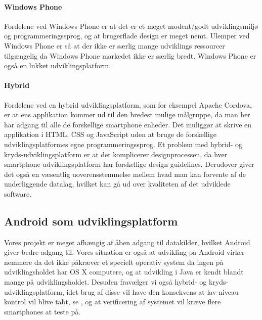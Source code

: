 \paragraph{Windows Phone}
Fordelene ved Windows Phone er at det er et meget modent/godt udviklingsmiljø og programmeringssprog, og at brugerflade design er meget nemt. 
Ulemper ved Windows Phone er så at der ikke er særlig mange udviklings ressourcer tilgængelig da Windows Phone markedet ikke er særlig bredt.
Windows Phone er også en lukket udviklingsplatform.

\paragraph{Hybrid}
Fordelene ved en hybrid udviklingsplatform, som for eksempel Apache Cordova, er at ens applikation kommer ud til den bredest mulige målgruppe, da man her har adgang til alle de forskellige smartphone enheder.
Det muliggør at skrive en applikation i HTML, CSS og JavaScript uden at bruge de forskellige udviklingsplatformes egne programmeringssprog.
Et problem med hybrid- og kryds-udviklingsplatform er at det komplicerer designprocessen, da hver smartphone udviklingsplatform har forskellige design guidelines.
Derudover giver det også en væsentlig uoverensstemmelse mellem hvad man kan forvente af de underliggende datalag, hvilket kan gå ud over kvaliteten af det udviklede software.

\subsection{Android som udviklingsplatform}
Vores projekt er meget afhængig af åben adgang til datakilder, hvilket Android giver bedre adgang til.
Vores situation er også at udvikling på Android virker nemmere da det ikke påkræver et specielt operativ system da ingen på udviklingsholdet har OS X computere, og at udvikling i Java er kendt blandt mange på udviklingsholdet.
Desuden fravælger vi også hybrid- og kryds-udviklingsplatform, idet brug af disse vil have den konsekvens at lav-niveau kontrol vil blive tabt, se \citet{misc:apachecordovasupport}, og at verificering af systemet vil kræve flere smartphones at teste på.
